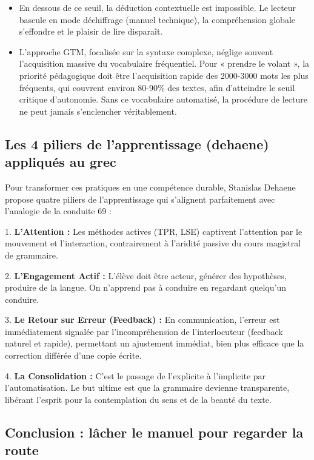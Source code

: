 \begin{itemize}\item En dessous de ce seuil, la déduction contextuelle est impossible. Le lecteur bascule en mode déchiffrage (manuel technique), la compréhension globale s'effondre et le plaisir de lire disparaît.\item L'approche GTM, focalisée sur la syntaxe complexe, néglige souvent l'acquisition massive du vocabulaire fréquentiel. Pour « prendre le volant », la priorité pédagogique doit être l'acquisition rapide des 2000-3000 mots les plus fréquents, qui couvrent environ 80-90\% des textes, afin d'atteindre le seuil critique d'autonomie.\cite{III-3-3-ref67} Sans ce vocabulaire automatisé, la procédure de lecture ne peut jamais s'enclencher véritablement.\end{itemize}

\subsection{Les 4 piliers de l'apprentissage (dehaene) appliqués au grec}

Pour transformer ces pratiques en une compétence durable, Stanislas Dehaene propose quatre piliers
de l'apprentissage qui s'alignent parfaitement avec l'analogie de la conduite 69 :

1. \textbf{L'Attention :} Les méthodes actives (TPR, LSE) captivent l'attention par le mouvement et
l'interaction, contrairement à l'aridité passive du cours magistral de grammaire.

2. \textbf{L'Engagement Actif :} L'élève doit être acteur, générer des hypothèses, produire de la
langue. On n'apprend pas à conduire en regardant quelqu'un conduire.

3. \textbf{Le Retour sur Erreur (Feedback) :} En communication, l'erreur est immédiatement signalée
par l'incompréhension de l'interlocuteur (feedback naturel et rapide), permettant un ajustement
immédiat, bien plus efficace que la correction différée d'une copie écrite.

4. \textbf{La Consolidation :} C'est le passage de l'explicite à l'implicite par l'automatisation.
Le but ultime est que la grammaire devienne transparente, libérant l'esprit pour la contemplation du
sens et de la beauté du texte.



\subsection{Conclusion : lâcher le manuel pour regarder la route}


